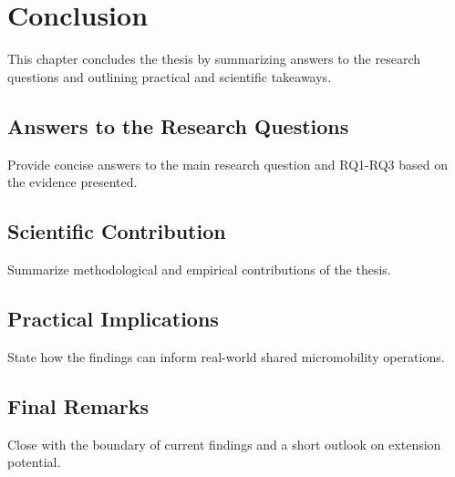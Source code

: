 \chapter{Conclusion}
\label{chapter:conclusion}

This chapter concludes the thesis by summarizing answers to the research questions and outlining practical and scientific takeaways.

\section{Answers to the Research Questions}
Provide concise answers to the main research question and RQ1-RQ3 based on the evidence presented.

\section{Scientific Contribution}
Summarize methodological and empirical contributions of the thesis.

\section{Practical Implications}
State how the findings can inform real-world shared micromobility operations.

\section{Final Remarks}
Close with the boundary of current findings and a short outlook on extension potential.

